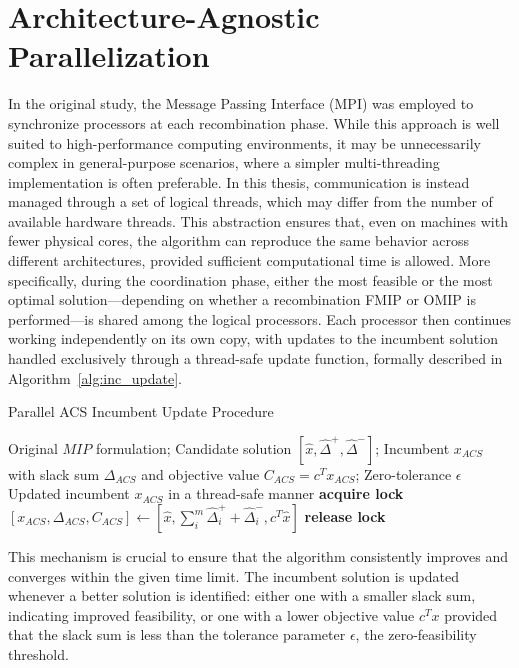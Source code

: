 \section{Architecture-Agnostic Parallelization}
In the original study, the Message Passing Interface (MPI) was employed to synchronize processors at each recombination phase. While this approach is well suited to high-performance computing environments, it may be unnecessarily complex in general-purpose scenarios, where a simpler multi-threading implementation is often preferable.  
In this thesis, communication is instead managed through a set of logical threads, which may differ from the number of available hardware threads. This abstraction ensures that, even on machines with fewer physical cores, the algorithm can reproduce the same behavior across different architectures, provided sufficient computational time is allowed.  
More specifically, during the coordination phase, either the most feasible or the most optimal solution—depending on whether a recombination FMIP or OMIP is performed—is shared among the logical processors. Each processor then continues working independently on its own copy, with updates to the incumbent solution handled exclusively through a thread-safe update function, formally described in Algorithm~\ref{alg:inc_update}.  
\begin{algorithm}[H]
\caption{Parallel ACS Incumbent Update Procedure}\label{alg:inc_update}
\begin{algorithmic}[1]
\Require Original $MIP$ formulation; Candidate solution $[\hat{x}, \hat{\Delta}^+, \hat{\Delta}^-]$; Incumbent $x_{ACS}$ with slack sum $\Delta_{ACS}$ and objective value $C_{ACS}=c^T x_{ACS}$; Zero-tolerance $\epsilon$
\Ensure Updated incumbent $x_{ACS}$ in a thread-safe manner
    \State \textbf{acquire lock}
        \State $[x_{ACS},\Delta_{ACS},C_{ACS}] \gets [\hat{x},\sum_i^m \hat{\Delta}_i^+ + \hat{\Delta}_i^-,c^T \hat{x}]$
    \EndIf
    \State \textbf{release lock}
\EndFunction
\end{algorithmic}
\end{algorithm}

This mechanism is crucial to ensure that the algorithm consistently improves and converges within the given time limit. The incumbent solution is updated whenever a better solution is identified: either one with a smaller slack sum, indicating improved feasibility, or one with a lower objective value $c^T x$ provided that the slack sum is less than the tolerance parameter $\epsilon$, the zero-feasibility threshold.

